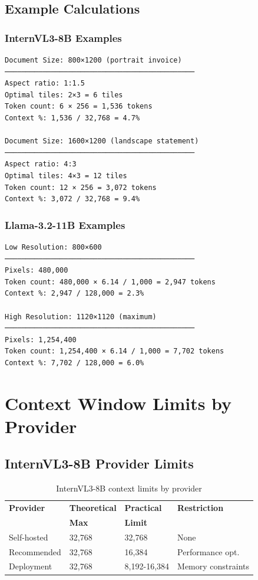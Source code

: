 \documentclass[11pt,a4paper]{article}
\begin{document}
\subsection{Example Calculations}

\subsubsection{InternVL3-8B Examples}

\begin{verbatim}
Document Size: 800×1200 (portrait invoice)
─────────────────────────────────────────────
Aspect ratio: 1:1.5
Optimal tiles: 2×3 = 6 tiles
Token count: 6 × 256 = 1,536 tokens
Context %: 1,536 / 32,768 = 4.7%

Document Size: 1600×1200 (landscape statement)
─────────────────────────────────────────────
Aspect ratio: 4:3
Optimal tiles: 4×3 = 12 tiles
Token count: 12 × 256 = 3,072 tokens
Context %: 3,072 / 32,768 = 9.4%
\end{verbatim}

\subsubsection{Llama-3.2-11B Examples}

\begin{verbatim}
Low Resolution: 800×600
─────────────────────────────────────────────
Pixels: 480,000
Token count: 480,000 × 6.14 / 1,000 = 2,947 tokens
Context %: 2,947 / 128,000 = 2.3%

High Resolution: 1120×1120 (maximum)
─────────────────────────────────────────────
Pixels: 1,254,400
Token count: 1,254,400 × 6.14 / 1,000 = 7,702 tokens
Context %: 7,702 / 128,000 = 6.0%
\end{verbatim}

\section{Context Window Limits by Provider}

\subsection{InternVL3-8B Provider Limits}

\begin{table}[h]
\centering
\begin{tabular}{llll}
\toprule
\textbf{Provider} & \textbf{Theoretical} & \textbf{Practical} & \textbf{Restriction} \\
& \textbf{Max} & \textbf{Limit} & \\
\midrule
Self-hosted & 32,768 & 32,768 & None \\
Recommended & 32,768 & 16,384 & Performance opt. \\
Deployment & 32,768 & 8,192-16,384 & Memory constraints \\
\bottomrule
\end{tabular}
\caption{InternVL3-8B context limits by provider}
\end{table}
\end{document}
